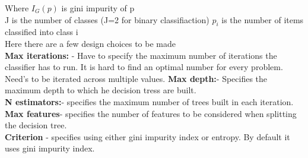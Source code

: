 \documentclass[sigconf]{acmart}
\begin{document}
Where $I_G(p)$ is gini impurity of p\\
J is the number of classes (J=2 for binary classifiaction)
$p_i$ is the number of items classified into class i\\
Here there are a few design choices to be made\\
\textbf{Max iterations:} - Have to specify the maximum number of iterations the classifier has to run. It is hard to find an optimal number for every problem. Need's to be iterated across multiple values. 
\textbf{Max depth:}- Specifies the maximum depth to which he decision tress are built.\\
\textbf{N estimators:}- specifies the maximum number of trees built in each iteration.\\
\textbf{Max features}- specifies the number of features to be considered when splitting the decision tree.\\
\textbf{Criterion} - specifies using either gini impurity index or entropy. By default it uses gini impurity index.
\end{document}
